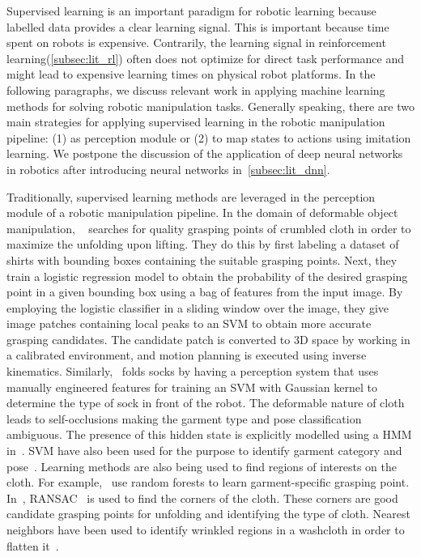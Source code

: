 \documentclass[\home/main.tex]{subfiles}
\begin{document}
Supervised learning is an important paradigm for robotic learning because labelled data provides a clear learning signal. This is important because time spent on robots is expensive. Contrarily, the learning signal in reinforcement learning(\cref{subsec:lit_rl}) often does not optimize for direct task performance and might lead to expensive learning times on physical robot platforms. In the following paragraphs, we discuss relevant work in applying machine learning methods for solving robotic manipulation tasks. Generally speaking, there are two main strategies for applying supervised learning in the robotic manipulation pipeline: (1) as perception module or (2) to map states to actions using imitation learning. We postpone the discussion of the application of deep neural networks in robotics after introducing neural networks in~\cref{subsec:lit_dnn}.

Traditionally, supervised learning methods are leveraged in the perception module of a robotic manipulation pipeline. In the domain of deformable object manipulation, ~\textcite{Ramisa2012} searches for quality grasping points of crumbled cloth in order to maximize the unfolding upon lifting. They do this by first labeling a dataset of shirts with bounding boxes containing the suitable grasping points. Next, they train a logistic regression model to obtain the probability of the desired grasping point in a given bounding box using a bag of features from the input image. By employing the logistic classifier in a sliding window over the image, they give image patches containing local peaks to an \acrshort{SVM} to obtain more accurate grasping candidates. The candidate patch is converted to 3D space by working in a calibrated environment, and motion planning is executed using inverse kinematics. Similarly,~\textcite{Wang2011} folds socks by having a perception system that uses manually engineered features for training an \acrshort{SVM} with Gaussian kernel to determine the type of sock in front of the robot. The deformable nature of cloth leads to self-occlusions making the garment type and pose classification ambiguous. The presence of this hidden state is explicitly modelled using a \acrshort{HMM} in~\autocite{Cusumano2011}. \acrshort{SVM} have also been used for the purpose to identify garment category and pose~\autocite{Li2014, li2014volum}. Learning methods are also being used to find regions of interests on the cloth. For example,~\textcite{Doumanoglou2016} use random forests to learn garment-specific grasping point. In~\autocite{Maitin2010}, RANSAC~\autocite{RANSAC} is used to find the corners of the cloth. These corners are good candidate grasping points for unfolding and identifying the type of cloth. Nearest neighbors have been used to identify wrinkled regions in a washcloth in order to flatten it~\autocite{Willimon2011}. 
\end{document}
